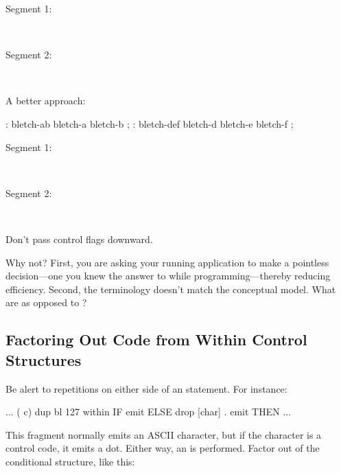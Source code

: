 \begin{description}
\item[Segment 1:]~~ 
\item[Segment 2:]~~ 
\end{description}

\noindent A better approach:

\begin{Code}
: bletch-ab   bletch-a bletch-b ;
: bletch-def   bletch-d bletch-e bletch-f ;
\end{Code}

\begin{description}
\item[Segment 1:]~~ 
\item[Segment 2:]~~ 
\end{description}

\begin{tip}
Don't pass control flags downward.
\end{tip}
Why not? First, you are asking your running application to make a
pointless decision---one you knew the answer to while
programming---thereby reducing efficiency. Second, the terminology
doesn't match the conceptual model. What are 
as opposed to ?

\subsection{Factoring Out Code from Within Control Structures}

Be alert to repetitions on either side of an
 statement. For instance:

\begin{Code}
... ( c)  dup  bl 127 within
       IF  emit  ELSE
       drop [char] . emit   THEN ...
\end{Code}
This fragment normally emits an ASCII character, but if the character
is a control code, it emits a dot. Either way, an  is
performed. Factor  out of the conditional structure, like
this:

